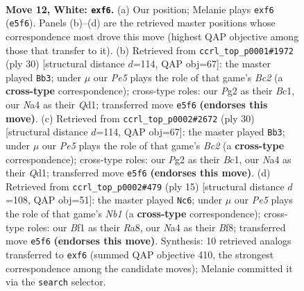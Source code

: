 \documentclass[11pt]{article}
\begin{document}
\clearpage

\begin{figure}[p]\centering
\begin{subfigure}{0.46\textwidth}\centering
\resizebox{\linewidth}{!}{%
\newchessgame
\chessboard[
  setfen={rnb1k2r/pppn4/4p3/3pPp1p/N2P3q/8/PPP2NPP/R2QKB1R w KQkq f6 0 12},
  showmover=false,
  pgfstyle=straightmove, color=movearrow, markmove={e5-f6}
]}
\caption{}
\end{subfigure}\hfill
\begin{subfigure}{0.46\textwidth}\centering
\resizebox{\linewidth}{!}{%
\newchessgame
\chessboard[
  setfen={2r1k2r/pp1nbppp/4pn2/1P5q/8/P4N2/1PB2PPP/R1BQR1K1 w k - 7 16},
  showmover=false,
  pgfstyle=straightmove, color=movearrow, markmove={c2-b3}
]}
\caption{}
\end{subfigure}
\\[4pt]
\begin{subfigure}{0.46\textwidth}\centering
\resizebox{\linewidth}{!}{%
\newchessgame
\chessboard[
  setfen={2r1k2r/pp1nbppp/4pn2/1P5q/8/P4N2/1PB2PPP/R1BQR1K1 w k - 7 16},
  showmover=false,
  pgfstyle=straightmove, color=movearrow, markmove={c2-b3}
]}
\caption{}
\end{subfigure}\hfill
\begin{subfigure}{0.46\textwidth}\centering
\resizebox{\linewidth}{!}{%
\newchessgame
\chessboard[
  setfen={rn1qkb1r/ppp2ppp/4p3/3nP3/5P2/3Q1N2/PPP3PP/RNB1K2R b KQkq - 1 8},
  showmover=false,
  pgfstyle=straightmove, color=movearrow, markmove={b8-c6}
]}
\caption{}
\end{subfigure}
\caption{\textbf{Move 12, White: \texttt{exf6}.} (a) Our position; Melanie plays \texttt{exf6} (\texttt{e5f6}). Panels (b)--(d) are the retrieved master positions whose correspondence most drove this move (highest QAP objective among those that transfer to it). (b) Retrieved from \texttt{ccrl\_top\_p0001\#1972} (ply 30) [structural distance $d$=114, QAP obj=67]: the master played \texttt{Bb3}; under $\mu$ our \emph{Pe5} plays the role of that game's \emph{Bc2} (a \textbf{cross-type} correspondence); cross-type roles: our \emph{P}g2 as their \emph{B}c1, our \emph{N}a4 as their \emph{Q}d1; transferred move \texttt{e5f6} \textbf{(endorses this move)}. (c) Retrieved from \texttt{ccrl\_top\_p0002\#2672} (ply 30) [structural distance $d$=114, QAP obj=67]: the master played \texttt{Bb3}; under $\mu$ our \emph{Pe5} plays the role of that game's \emph{Bc2} (a \textbf{cross-type} correspondence); cross-type roles: our \emph{P}g2 as their \emph{B}c1, our \emph{N}a4 as their \emph{Q}d1; transferred move \texttt{e5f6} \textbf{(endorses this move)}. (d) Retrieved from \texttt{ccrl\_top\_p0002\#479} (ply 15) [structural distance $d$=108, QAP obj=51]: the master played \texttt{Nc6}; under $\mu$ our \emph{Pe5} plays the role of that game's \emph{Nb1} (a \textbf{cross-type} correspondence); cross-type roles: our \emph{B}f1 as their \emph{R}a8, our \emph{N}a4 as their \emph{B}f8; transferred move \texttt{e5f6} \textbf{(endorses this move)}. Synthesis: 10 retrieved analogs transferred to \texttt{exf6} (summed QAP objective 410, the strongest correspondence among the candidate moves); Melanie committed it via the \texttt{search} selector.}
\label{fig:thought-m22}
\end{figure}
\end{document}
